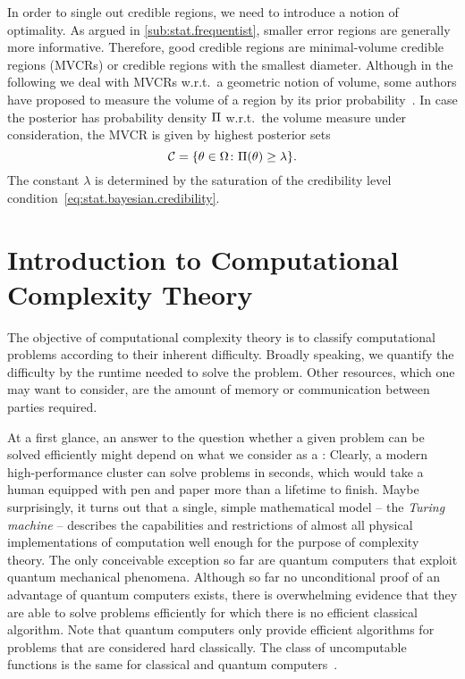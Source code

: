 In order to single out  credible regions, we need to introduce a notion of optimality.
As argued in \cref{sub:stat.frequentist}, smaller error regions are generally more informative.
Therefore, good credible regions are minimal-volume credible regions (MVCRs) or credible regions with the smallest diameter.
Although in the following we deal with MVCRs w.r.t.\ a geometric notion of volume, some authors have proposed to measure the volume of a region by its prior probability~\cite{Evans_2006_Optimally,Shang_2013_Optimal}.
In case the posterior has probability density $\Pi$ w.r.t.\ the volume measure under consideration, the MVCR is given by highest posterior sets~\cite{Ferrie_2014_High}
\[
  \label{eq:stat.bayesian.mvcr}
  \mathcal{C} = \{ \theta \in \Omega\colon \Pi(\theta) \ge \lambda \}.
\]
The constant $\lambda$ is determined by the saturation of the credibility level condition~\eqref{eq:stat.bayesian.credibility}.




\section{Introduction to Computational Complexity Theory}%
\label{sec:error.complexity}

The objective of computational complexity theory is to classify computational problems according to their inherent difficulty.
Broadly speaking, we quantify the difficulty by the runtime needed to solve the problem.
Other resources, which one may want to consider, are the amount of memory or communication between parties required.

At a first glance, an answer to the question whether a given problem can be solved efficiently might depend on what we consider as a :
Clearly, a modern high-performance cluster can solve problems in seconds, which would take a human equipped with pen and paper more than a lifetime to finish.
Maybe surprisingly, it turns out that a single, simple mathematical model -- the \emph{Turing machine} -- describes the capabilities and restrictions of almost all physical implementations of computation well enough for the purpose of complexity theory.
The only conceivable exception so far are quantum computers that exploit quantum mechanical phenomena.
Although so far no unconditional proof of an advantage of quantum computers exists, there is overwhelming evidence that they are able to solve problems efficiently for which there is no efficient classical algorithm.
Note that quantum computers only provide efficient algorithms for problems that are considered hard classically.
The class of uncomputable functions is the same for classical and quantum computers~\cite{Arora_2009_Computational}.




